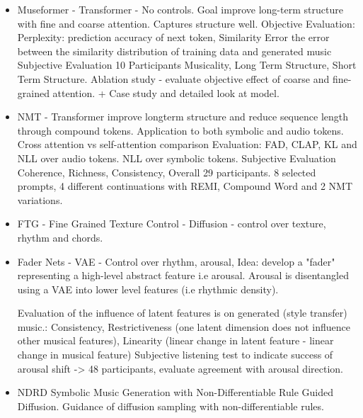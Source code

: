 \begin{itemize}
\item{Museformer} \cite{Yu_Lu_Wang_Hu_Tan_Ye_Zhang_museformer_2022} - Transformer - No controls. Goal improve long-term structure with fine and coarse attention. Captures structure well. 
Objective Evaluation: Perplexity: prediction accuracy of next token, Similarity Error the error between the similarity distribution of training data and generated
music 
Subjective Evaluation 10 Participants Musicality, Long Term Structure, Short Term Structure.
Ablation study - evaluate objective effect of coarse and fine-grained attention. + Case study and detailed look at model.

\item{NMT} \cite{Ryu_Dong_nested_2024} - Transformer improve longterm structure and reduce sequence length through compound tokens. Application to both symbolic and audio tokens. 
Cross attention vs self-attention comparison 
Evaluation: FAD, CLAP, KL and NLL over audio tokens. NLL over symbolic tokens. 
Subjective Evaluation Coherence, Richness, Consistency, Overall 29 participants. 8 selected prompts, 4 different continuations with REMI, Compound Word and 2 NMT variations.


\item{FTG - Fine Grained Texture Control} - Diffusion - control over texture, rhythm and chords. 

\item{Fader Nets}\cite{Tan_Herremans_2020} - VAE - Control over rhythm, arousal, 
Idea: develop a "fader" representing a high-level abstract feature i.e arousal. Arousal is disentangled using a VAE into lower level features (i.e rhythmic density).

Evaluation of the influence of latent features is on generated (style transfer) music.:
Consistency, Restrictiveness (one latent dimension does not influence other musical features), Linearity (linear change in latent feature - linear change in musical feature)
Subjective listening test to indicate success of arousal shift -> 48 participants, evaluate agreement with arousal direction. 

\item{NDRD} Symbolic Music Generation with Non-Differentiable Rule Guided Diffusion.
Guidance of diffusion sampling with non-differentiable rules. 
\end{itemize}
